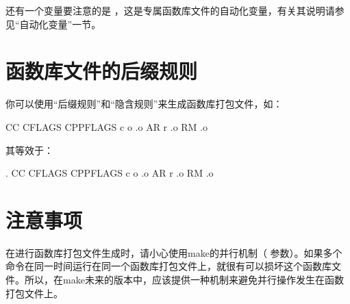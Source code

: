 \documentclass[a4paper,10pt]{sphinxmanual}
\begin{document}
\begin{sphinxVerbatim}[commandchars=\\\{\}]
    
   
  
\end{sphinxVerbatim}

还有一个变量要注意的是 \sphinxcode{\sphinxupquote{\$\%}} ，这是专属函数库文件的自动化变量，有关其说明请参见“自动化变量”一节。


\section{函数库文件的后缀规则}
\label{\detokenize{archives:id3}}
你可以使用“后缀规则”和“隐含规则”来生成函数库打包文件，如：

\begin{sphinxVerbatim}[commandchars=\\\{\}]
    CC CFLAGS CPPFLAGS \PYGZhy{}c \PYGZdl{}\PYGZlt{} \PYGZhy{}o .o
    AR r  .o
    RM .o
\end{sphinxVerbatim}

其等效于：

\begin{sphinxVerbatim}[commandchars=\\\{\}]
 \PYGZpc{}.
    CC CFLAGS CPPFLAGS \PYGZhy{}c \PYGZdl{}\PYGZlt{} \PYGZhy{}o .o
    AR r  .o
    RM .o
\end{sphinxVerbatim}


\section{注意事项}
\label{\detokenize{archives:id4}}
在进行函数库打包文件生成时，请小心使用make的并行机制（  参数）。如果多个
 命令在同一时间运行在同一个函数库打包文件上，就很有可以损坏这个函数库文件。所以，在make未来的版本中，应该提供一种机制来避免并行操作发生在函数打包文件上。
\end{document}
